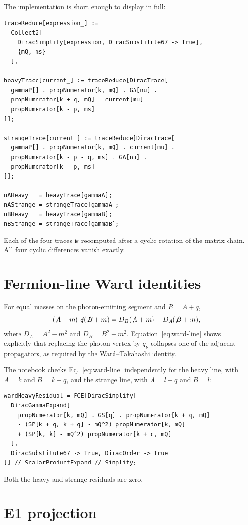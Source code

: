 \documentclass[11pt]{article}
\begin{document}
The implementation is short enough to display in full:
\begin{lstlisting}
traceReduce[expression_] :=
  Collect2[
    DiracSimplify[expression, DiracSubstitute67 -> True],
    {mQ, ms}
  ];

heavyTrace[current_] := traceReduce[DiracTrace[
  gammaP[] . propNumerator[k, mQ] . GA[nu] .
  propNumerator[k + q, mQ] . current[mu] .
  propNumerator[k - p, ms]
]];

strangeTrace[current_] := traceReduce[DiracTrace[
  gammaP[] . propNumerator[k, mQ] . current[mu] .
  propNumerator[k - p - q, ms] . GA[nu] .
  propNumerator[k - p, ms]
]];

nAHeavy   = heavyTrace[gammaA];
nAStrange = strangeTrace[gammaA];
nBHeavy   = heavyTrace[gammaB];
nBStrange = strangeTrace[gammaB];
\end{lstlisting}
Each of the four traces is recomputed after a cyclic rotation of the matrix
chain.  All four cyclic differences vanish exactly.

\section{Fermion-line Ward identities}

For equal masses on the photon-emitting segment and $B=A+q$,
\begin{equation}
  (\not\!A+m)\not\!q(\not\!B+m)
  =D_B(\not\!A+m)-D_A(\not\!B+m),
  \label{eq:ward-line}
\end{equation}
where $D_A=A^2-m^2$ and $D_B=B^2-m^2$.  Equation~\eqref{eq:ward-line}
shows explicitly that replacing the photon vertex by $q_\nu$ collapses one of
the adjacent propagators, as required by the Ward--Takahashi identity.

The notebook checks Eq.~\eqref{eq:ward-line} independently for the heavy line,
with $A=k$ and $B=k+q$, and the strange line, with $A=l-q$ and $B=l$:
\begin{lstlisting}
wardHeavyResidual = FCE[DiracSimplify[
  DiracGammaExpand[
    propNumerator[k, mQ] . GS[q] . propNumerator[k + q, mQ]
    - (SP[k + q, k + q] - mQ^2) propNumerator[k, mQ]
    + (SP[k, k] - mQ^2) propNumerator[k + q, mQ]
  ],
  DiracSubstitute67 -> True, DiracOrder -> True
]] // ScalarProductExpand // Simplify;
\end{lstlisting}
Both the heavy and strange residuals are zero.

\section{E1 projection}
\end{document}
